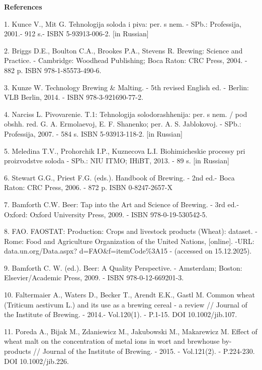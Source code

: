 \begin{center}
{\bfseries References}
\end{center}

\begin{refs}
1. Kunce V., Mit G. Tehnologija soloda i piva: per. s nem. - SPb.:
Professija, 2001.- 912 s.- ISBN 5-93913-006-2. {[}in Russian{]}

2. Briggs D.E., Boulton C.A., Brookes P.A., Stevens R. Brewing: Science
and Practice. - Cambridge: Woodhead Publishing; Boca Raton: CRC Press,
2004. - 882 p. ISBN 978-1-85573-490-6.

3. Kunze W. Technology Brewing \& Malting. - 5th revised English ed. -
Berlin: VLB Berlin, 2014. - ISBN 978-3-921690-77-2.

4. Narciss L. Pivovarenie. T.1: Tehnologija solodorashhenija: per. s
nem. / pod obshh. red. G. A. Ermolaevoj, E. F. Shanenko; per. A. S.
Jablokovoj. - SPb.: Professija, 2007. - 584 s. ISBN 5-93913-118-2. {[}in
Russian{]}

5. Meledina T.V., Prohorchik I.P., Kuznecova L.I. Biohimicheskie
processy pri proizvodstve soloda - SPb.: NIU ITMO; IHiBT, 2013. - 89 s.
{[}in Russian{]}

6. Stewart G.G., Priest F.G. (eds.). Handbook of Brewing. - 2nd ed.-
Boca Raton: CRC Press, 2006. - 872 p. ISBN 0-8247-2657-X

7. Bamforth C.W. Beer: Tap into the Art and Science of Brewing. - 3rd
ed.-Oxford: Oxford University Press, 2009. - ISBN 978-0-19-530542-5.

8. FAO. FAOSTAT: Production: Crops and livestock products (Wheat):
dataset. - Rome: Food and Agriculture Organization of the United
Nations, {[}online{]}. -URL: data.un.org/Data.aspx?
d=FAO\&f=itemCode\%3A15 - (accessed on 15.12.2025).

9. Bamforth C. W. (ed.). Beer: A Quality Perspective. - Amsterdam;
Boston: Elsevier/Academic Press, 2009. - ISBN 978-0-12-669201-3.

10. Faltermaier A., Waters D., Becker T., Arendt E.K., Gastl M. Common
wheat (Triticum aestivum L.) and its use as a brewing cereal - a review
// Journal of the Institute of Brewing. - 2014.- Vol.120(1). - P.1-15.
DOI 10.1002/jib.107.

11. Poreda A., Bijak M., Zdaniewicz M., Jakubowski M., Makarewicz M.
Effect of wheat malt on the concentration of metal ions in wort and
brewhouse by-products // Journal of the Institute of Brewing. - 2015. -
Vol.121(2). - P.224-230. DOI 10.1002/jib.226.


\end{refs}
